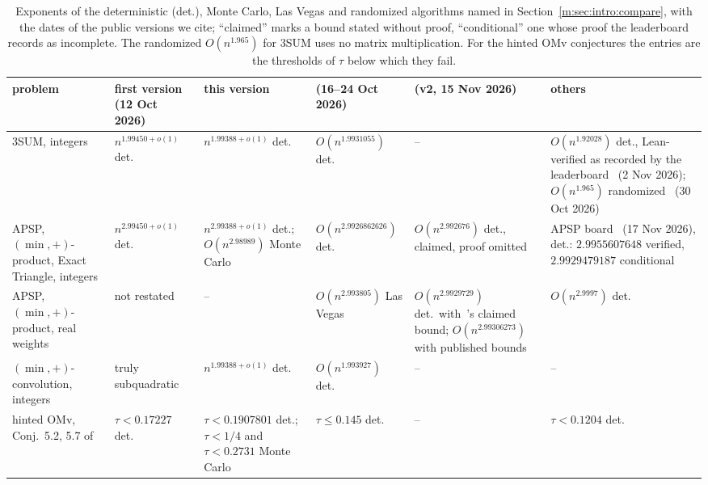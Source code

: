 \documentclass[11pt]{article}
\theoremstyle{definition}
\theoremstyle{remark}
\newcommand{\ExpThreeSumVone}{1.99450}%
\newcommand{\ExpThreeSumBest}{1.99388}%
\newcommand{\ExpThreeSumShrTwentySix}{1.9931055}%
\newcommand{\MinConvShrTwentySix}{1.993927}%
\newcommand{\MinConvRBest}{1.99388}%
\newcommand{\APSPrealLVShrTwentySix}{2.993805}%
\newcommand{\HintedOMvRtwenty}{0.1907801}%
\newcommand{\APSPrealDetNow}{2.9929729}%
\newcommand{\APSPmcOurs}{2.98989}%
\newcommand{\HintedOMvLitDet}{0.17227}%
\newcommand{\HintedOMvMcOurs}{0.2731}%
\newcommand{\ExpAPSPBest}{2.99388}%
\newcommand{\APSPdetShrTwentySix}{2.9926862626}%
\newcommand{\APSPdetEZClaim}{2.992676}%
\newcommand{\ExpAPSPVone}{2.99450}%
\newcommand{\ThreeSumRandCIMY}{1.965}%
\newcommand{\ThreeSumDetLean}{1.92028}%
\newcommand{\APSPrealDetPublished}{2.99306273}%
\begin{document}
\begin{table}[ht]
\centering\footnotesize
\renewcommand{\arraystretch}{1.15}\setlength{\tabcolsep}{3pt}
\begin{tabular}{@{}>{\raggedright}p{}>{\raggedright}p{}>{\raggedright}p{}>{\raggedright}p{}>{\raggedright}p{}>{\raggedright\arraybackslash}p{}@{}}
problem & first version (12 Oct 2026) & this version & \cite{Shr26} (16--24 Oct 2026) & \cite{EZ26} (v2, 15 Nov 2026) & others\\\hline
3SUM, integers & $n^{\ExpThreeSumVone+o(1)}$ det. & $n^{\ExpThreeSumBest+o(1)}$ det. & $O(n^{\ExpThreeSumShrTwentySix})$ det. & -- & $O(n^{\ThreeSumDetLean})$ det., Lean-verified as recorded by the leaderboard~\cite{Wang26} (2 Nov 2026); $O(n^{\ThreeSumRandCIMY})$ randomized~\cite{CIMY26} (30 Oct 2026)\\
APSP, $(\min,+)$-product, Exact Triangle, integers & $n^{\ExpAPSPVone+o(1)}$ det. & $n^{\ExpAPSPBest+o(1)}$ det.; $O(n^{\APSPmcOurs})$ Monte Carlo & $O(n^{\APSPdetShrTwentySix})$ det. & $O(n^{\APSPdetEZClaim})$ det., claimed, proof omitted & APSP board~\cite{BOS26} (17 Nov 2026), det.: $2.9955607648$ verified, $2.9929479187$ conditional\\
APSP, $(\min,+)$-product, real weights & not restated & -- & $O(n^{\APSPrealLVShrTwentySix})$ Las Vegas & $O(n^{\APSPrealDetNow})$ det.\ with~\cite{Uzn26}'s claimed bound; $O(n^{\APSPrealDetPublished})$ with published bounds & $O(n^{2.9997})$ det.~\cite{CIMY26}\\
$(\min,+)$-convolution, integers & truly subquadratic & $n^{\MinConvRBest+o(1)}$ det. & $O(n^{\MinConvShrTwentySix})$ det. & -- & --\\
hinted OMv, Conj.~5.2, 5.7 of~\cite{BNS19} & $\tau<\HintedOMvLitDet$ det. & $\tau<\HintedOMvRtwenty$ det.; $\tau<1/4$ and $\tau<\HintedOMvMcOurs$ Monte Carlo & $\tau\le0.145$ det. & -- & $\tau<0.1204$ det.~\cite{ZT}
\end{tabular}
\caption{Exponents of the deterministic (det.), Monte Carlo, Las Vegas and randomized algorithms named in Section~\ref{m:sec:intro:compare}, with the dates of the public versions we cite; ``claimed'' marks a bound stated without proof, ``conditional'' one whose proof the leaderboard records as incomplete. The randomized $O(n^{\ThreeSumRandCIMY})$ for 3SUM uses no matrix multiplication. For the hinted OMv conjectures the entries are the thresholds of $\tau$ below which they fail.}
\label{tab:compare}
\end{table}
\end{document}
